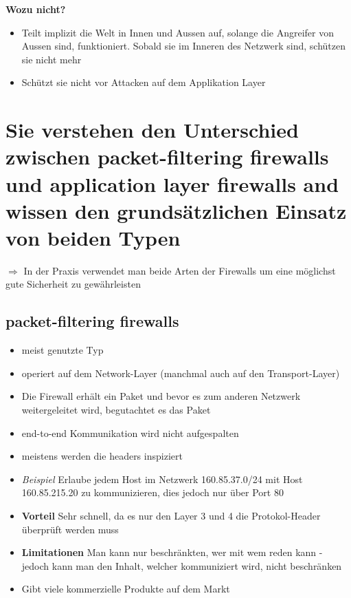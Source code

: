 \documentclass{report}
\theoremstyle{definition}
\theoremstyle{example}
\begin{document}
\textbf{Wozu nicht?}
\begin{itemize}
	\item Teilt implizit die Welt in Innen und Aussen auf, solange die Angreifer von Aussen sind, funktioniert. Sobald sie im Inneren des Netzwerk sind, schützen sie nicht mehr
	\item Schützt sie nicht vor Attacken auf dem Applikation Layer
\end{itemize}


\section{Sie verstehen den Unterschied zwischen packet-filtering firewalls und application layer firewalls and wissen den grundsätzlichen Einsatz von beiden Typen}
$\Rightarrow$ In der Praxis verwendet man beide Arten der Firewalls um eine möglichst gute Sicherheit zu gewährleisten
	\subsection{packet-filtering firewalls}
\begin{itemize}
	\item meist genutzte Typ
	\item operiert auf dem Network-Layer (manchmal auch auf den Transport-Layer)
	\item Die Firewall erhält ein Paket und bevor es zum anderen Netzwerk weitergeleitet wird, begutachtet es das Paket
	\item end-to-end Kommunikation wird nicht aufgespalten
	\item meistens werden die headers inspiziert 
	\item \textit{Beispiel} Erlaube jedem Host im Netzwerk 160.85.37.0/24 mit Host 160.85.215.20 zu kommunizieren, dies jedoch nur über Port 80
	\item \textbf{Vorteil} Sehr schnell, da es nur den Layer 3 und 4 die Protokol-Header überprüft werden muss
	\item \textbf{Limitationen} Man kann nur beschränkten, wer mit wem reden kann - jedoch kann man den Inhalt, welcher kommuniziert wird, nicht beschränken
	\item Gibt viele kommerzielle Produkte auf dem Markt
\end{itemize}
	
\end{document}
